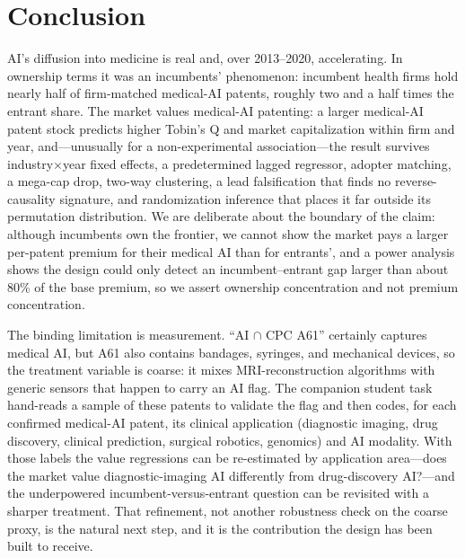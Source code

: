 \documentclass[12pt]{article}
\begin{document}
\section{Conclusion}\label{sec:concl}
AI's diffusion into medicine is real and, over 2013--2020, accelerating. In ownership terms it was
an incumbents' phenomenon: incumbent health firms hold nearly half of firm-matched medical-AI
patents, roughly two and a half times the entrant share. The market values medical-AI patenting: a
larger medical-AI patent stock predicts higher Tobin's Q and market capitalization within firm and
year, and---unusually for a non-experimental association---the result survives industry$\times$year
fixed effects, a predetermined lagged regressor, adopter matching, a mega-cap drop, two-way
clustering, a lead falsification that finds no reverse-causality signature, and randomization
inference that places it far outside its permutation distribution. We are deliberate about the
boundary of the claim: although incumbents own the frontier, we cannot show the market pays a
larger per-patent premium for their medical AI than for entrants', and a power analysis shows the
design could only detect an incumbent--entrant gap larger than about 80\% of the base premium, so we
assert ownership concentration and not premium concentration.

The binding limitation is measurement. ``AI $\cap$ CPC A61'' certainly captures medical AI, but A61
also contains bandages, syringes, and mechanical devices, so the treatment variable is coarse: it
mixes MRI-reconstruction algorithms with generic sensors that happen to carry an AI flag. The
companion student task hand-reads a sample of these patents to validate the flag and then codes,
for each confirmed medical-AI patent, its clinical application (diagnostic imaging, drug discovery,
clinical prediction, surgical robotics, genomics) and AI modality. With those labels the value
regressions can be re-estimated by application area---does the market value diagnostic-imaging AI
differently from drug-discovery AI?---and the underpowered incumbent-versus-entrant question can be
revisited with a sharper treatment. That refinement, not another robustness check on the coarse
proxy, is the natural next step, and it is the contribution the design has been built to receive.
\end{document}
